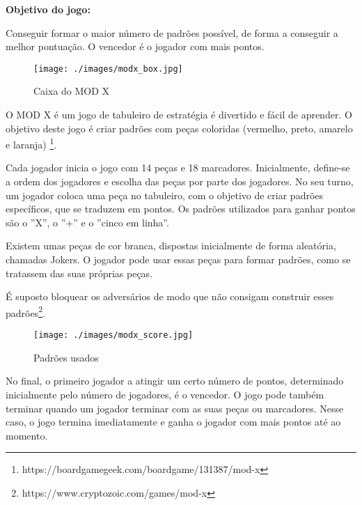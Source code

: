 \documentclass[a4paper]{article}
\begin{document}
\textbf{Objetivo do jogo:}

Conseguir formar o maior número de padrões possível, de forma a conseguir a melhor pontuação. O vencedor é o jogador com mais pontos.  

\vspace{0.5cm}

\begin{figure}[h!]
	\begin{center}
		\texttt{[image: ./images/modx\_box.jpg]}
		\caption{Caixa do MOD X}
		\label{fig:1}
	\end{center}
\end{figure}

\vspace{0.5cm}

O MOD X é um jogo de tabuleiro de estratégia é divertido e fácil de aprender. 
O objetivo deste jogo é criar padrões com peças coloridas (vermelho, preto, amarelo e laranja) \footnote{https://boardgamegeek.com/boardgame/131387/mod-x}.

Cada jogador inicia o jogo com 14 peças e 18 marcadores.
Inicialmente, define-se a ordem dos jogadores e escolha das peças por parte dos jogadores.  
No seu turno, um jogador coloca uma peça no tabuleiro, com o objetivo de criar padrões específicos, que se traduzem em pontos.
Os padrões utilizados para ganhar pontos são o ''X'', o ''+'' e o ''cinco em linha''.

Existem umas peças de cor branca, dispostas inicialmente de forma aleatória, chamadas Jokers. O jogador pode usar essas peças para formar padrões, como se tratassem das suas próprias peças.

É suposto bloquear os adversários de modo que não consigam construir esses padrões\footnote{https://www.cryptozoic.com/games/mod-x}.

\vspace{0.5cm}

\begin{figure}[h!]
	\begin{center}
		\texttt{[image: ./images/modx\_score.jpg]}
		\caption{Padrões usados}
		\label{fig:2}
	\end{center}
\end{figure}

\vspace{0.5cm}

No final, o primeiro jogador a atingir um certo número de pontos, determinado inicialmente pelo número de jogadores, é o vencedor.
O jogo pode também terminar quando um jogador terminar com as suas peças ou marcadores.
Nesse caso, o jogo termina imediatamente e ganha o jogador com mais pontos até ao momento.
\end{document}
